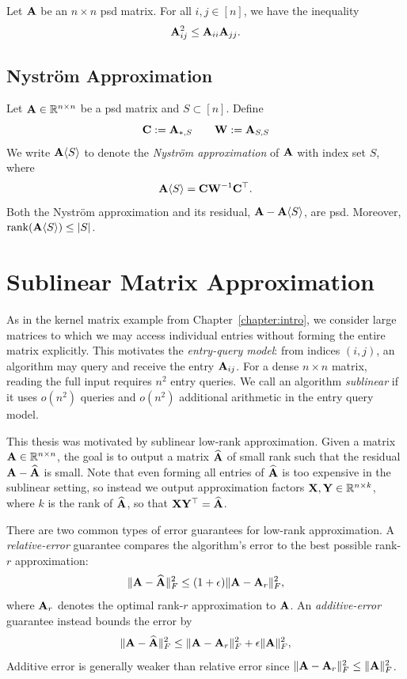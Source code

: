\begin{fact}
    \label{fact:psd-inequality}
    Let $\mathbf{A}$ be an $n\times n$ psd matrix. For all $i,j\in [n]$, we have the inequality
    \[\mathbf{A}_{ij}^2\leq\mathbf{A}_{ii}\mathbf{A}_{jj}.\]
\end{fact}
\subsection{Nystr\"om Approximation}
Let $\mathbf{A}\in\mathbb{R}^{n\times n}$ be a psd matrix and $S\subset[n]$. Define
\[\mathbf{C} := \mathbf{A}_{\ast, S}\qquad\mathbf{W} := \mathbf{A}_{S, S}\]
We write $\mathbf{A}\langle S\rangle$ to denote the \textit{Nystr\"om approximation} of $\mathbf{A}$ with index set $S$, where 
\[\mathbf{A}\langle S\rangle = \mathbf{C}\mathbf{W}^{-1}\mathbf{C}^\top.\]
Both the Nystr\"om approximation and its residual, $\mathbf{A} - \mathbf{A}\langle S\rangle$, are psd. Moreover, $\rank(\mathbf{A}\langle S\rangle) \leq |S|$.



\section{Sublinear Matrix Approximation}

As in the kernel matrix example from Chapter~\ref{chapter:intro}, we consider large matrices to which we may access individual entries without forming the entire matrix explicitly. This motivates the \textit{entry-query model}: from indices $(i,j)$, an algorithm may query and receive the entry $\mathbf{A}_{ij}$. For a dense $n\times n$ matrix, reading the full input requires $n^2$ entry queries. We call an algorithm \textit{sublinear} if it uses $o(n^2)$ queries and $o(n^2)$ additional arithmetic in the entry query model. 

This thesis was motivated by sublinear low-rank approximation. Given a matrix $\mathbf{A}\in\mathbb{R}^{n\times n}$, the goal is to output a matrix $\widehat {\mathbf{A}}$ of small rank such that the residual $\mathbf{A}-\widehat{\mathbf{A}}$ is small. Note that even forming all entries of $\widehat{\mathbf{A}}$ is too expensive in the sublinear setting, so instead we output approximation factors $\mathbf{X}, \mathbf{Y}\in\mathbb{R}^{n\times k}$, where $k$ is the rank of $\widehat{\mathbf{A}}$, so that $\mathbf{X}\mathbf{Y}^\top = \widehat{\mathbf{A}}$.

There are two common types of error guarantees for low-rank approximation. A \textit{relative-error} guarantee compares the algorithm's error to the best possible rank-$r$ approximation:
\[
    \|\mathbf{A}-\widehat{\mathbf{A}}\|_F^2
    \leq
    (1+\epsilon)\|\mathbf{A}-\mathbf{A}_r\|_F^2,
\]
where $\mathbf{A}_r$ denotes the optimal rank-$r$ approximation to $\mathbf{A}$. An \textit{additive-error} guarantee instead bounds the error by
\[
    \|\mathbf{A}-\widehat{\mathbf{A}}\|_F^2
    \leq
    \|\mathbf{A}-\mathbf{A}_r\|_F^2
    +
    \epsilon\|\mathbf{A}\|_F^2,
\]
Additive error is generally weaker than relative error since $\|\mathbf{A} - \mathbf{A}_r\|^2_F\leq \|\mathbf{A}\|^2_F$. 

